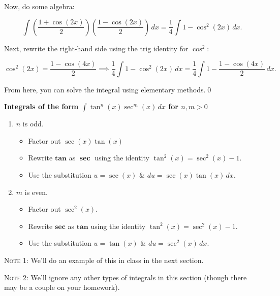 \documentclass[12pt]{article}
\begin{document}
	\noindent Now, do some algebra:
	
	$$\int\left(\frac{1+\cos(2x)}{2}\right)\left(\frac{1-\cos(2x)}{2}\right)\,dx=\frac{1}{4}\int 1-\cos^2(2x)\,dx.$$
	\vspace{1.5mm}

	\noindent Next, rewrite the right-hand side using the trig identity for $\cos^2$:
	
	$$\cos^2(2x)=\frac{1-\cos(4x)}{2}\implies\frac{1}{4}\int 1-\cos^2(2x)\,dx=\frac{1}{4}\int1-\frac{1-\cos(4x)}{2}\,dx.$$
	
	\noindent From here, you can solve the integral using elementary methods.\qed
	
	\newpage
	
	\noindent\textbf{Integrals of the form $\int\tan^n(x)\sec^m(x)\,dx$ for $n,m>0$}
	\begin{enumerate}
		\item $n$ is odd.
		\begin{itemize}
			\item Factor out $\sec(x)\tan(x)$
			\item Rewrite $\mathbf{tan}$ as $\mathbf{\sec}$ using the identity $\tan^2(x)=\sec^2(x)-1$.
			\item Use the substitution $u=\sec(x)$ \& $du=\sec(x)\tan(x)\,dx$.
		\end{itemize}	
		\item $m$ is even.
		\begin{itemize}
			\item Factor out $\sec^2(x)$.
			\item Rewrite $\mathbf{sec}$ as $\mathbf{tan}$ using the identity $\tan^2(x)=\sec^2(x)-1$.
			\item Use the substitution $u=\tan(x)$ \& $du=\sec^2(x)\,dx$.
		\end{itemize}	
	\end{enumerate}
	\vspace{3mm}
	\noindent\textsc{Note 1}: We'll do an example of this in class in the next section.
	
	\vspace{3mm}
	
	\noindent\textsc{Note 2}: We'll ignore any other types of integrals in this section (though there may be a couple on your homework).
	
\end{document}
